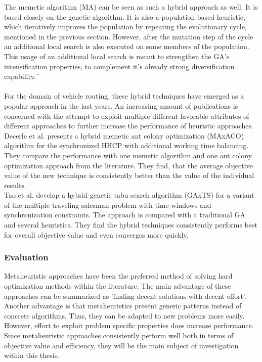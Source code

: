 The memetic algorithm (MA) can be seen as such a hybrid approach as well. It is based closely on the genetic algorithm. It is also a population based heuristic, which iteratively improves the population by repeating the evolutionary cycle, mentioned in the previous section. However, after the mutation step of the cycle an additional local search is also executed on some members of the population. This usage of an additional local search is meant to strengthen the GA's intensification properties, to complement it's already strong diversification capability.´\\ \\
For the domain of vehicle routing, these hybrid techniques have emerged as a popular approach in the last years. An increasing amount of publications is concerned with the attempt to exploit multiple different favorable attributes of different approaches to further increase the performance of heuristic approaches.\\ %
Decerle et al. \cite{decerle_hybrid_2019} presents a hybrid memetic ant colony optimization (MAxACO) algorithm for the synchronized HHCP with additional working time balancing. They compare the performance with one memetic algorithm and one ant colony optimization approach from the literature. They find, that the average objective value of the new technique is consistently better than the value of the individual results.\\
Tao et al. \cite{tao_metaheuristic_2019} develop a hybrid genetic tabu search algorithm (GAxTS) for a variant of the multiple traveling salesman problem with time windows and synchronization constraints. The approach is compared with a traditional GA and several heuristics. They find the hybrid techniques consistently performs best for overall objective value and even converges more quickly.

\subsubsection{Evaluation}

Metaheuristic approaches have been the preferred method of solving hard optimization methods within the literature. The main advantage of these approaches can be summarized as 'finding decent solutions with decent effort'. Another advantage is that metaheuristics present generic patterns instead of concrete algorithms. Thus, they can be adapted to new problems more easily. However, effort to exploit problem specific properties does increase performance.\\ %
Since metaheuristic approaches consistently perform well both in terms of objective value and efficiency, they will be the main subject of investigation within this thesis.

